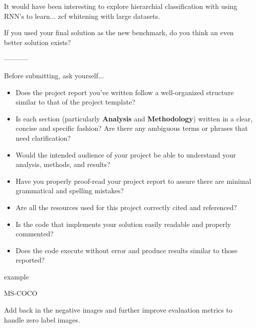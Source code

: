 \documentclass[12pt,journal,compsoc]{IEEEtran}
\begin{document}
It would have been interesting to explore hierarchial classification with using RNN's to learn...
zcf whitening with large datasets.

If you used your final solution as the new benchmark, do you think an even better solution exists?

-----------

Before submitting, ask yourself...
\begin{itemize}

  \item Does the project report you’ve written follow a well-organized structure similar to that of the project template?
  \item Is each section (particularly \textbf{Analysis} and \textbf{Methodology}) written in a clear, concise and specific fashion? Are there any ambiguous terms or phrases that need clarification?
  \item Would the intended audience of your project be able to understand your analysis, methods, and results?
  \item Have you properly proof-read your project report to assure there are minimal grammatical and spelling mistakes?
  \item Are all the resources used for this project correctly cited and referenced?
  \item Is the code that implements your solution easily readable and properly commented?
  \item Does the code execute without error and produce results similar to those reported?

\end{itemize}

example~\cite{Sechidis2011}

MS-COCO~\cite{MSCOCO}

Add back in the negative images and further improve evaluation metrics to handle zero label images.




\end{document}
